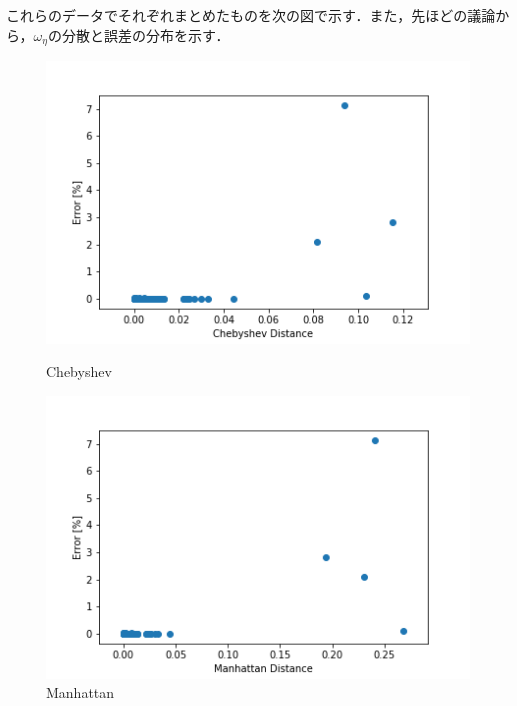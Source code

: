 \documentclass[16.7pt]{jsarticle}
\begin{document}
		これらのデータでそれぞれまとめたものを次の図で示す．また，先ほどの議論から，$ \omega_{\eta} $の分散と誤差の分布を示す．
			\begin{figure}[h]
			\centering
			\begin{minipage}{0.45\hsize}
				\centering
				\includegraphics[width= 0.85\columnwidth]{./figure/Chebyshev.png}
				\caption{Chebyshev}
			\end{minipage}
			\begin{minipage}{0.45\hsize}
				\centering
				\includegraphics[width= 0.85\columnwidth]{./figure/Manhattan.png}
				\caption{Manhattan}
			\end{minipage}
		\end{figure}
\end{document}
